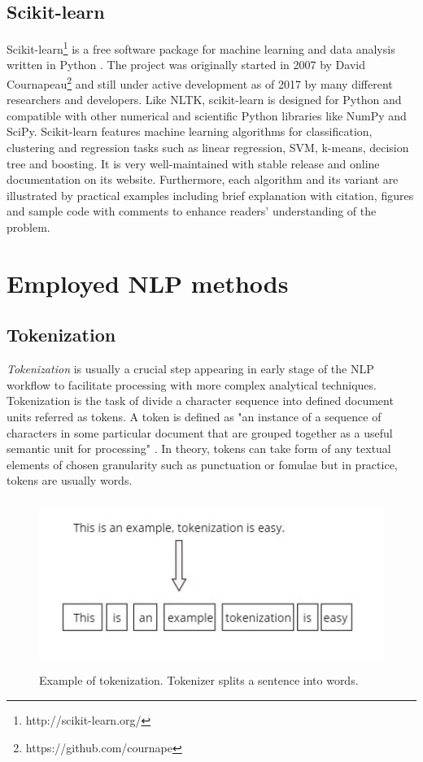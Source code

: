 \subsection*{Scikit-learn}
Scikit-learn\footnote{http://scikit-learn.org/} is a free software package for machine learning and data analysis written in Python \cite{scikit-learn}. The project was originally started in 2007 by David Cournapeau\footnote{https://github.com/cournape} and still under active development as of 2017 by many different researchers and developers. Like NLTK, scikit-learn is designed for Python and compatible with other numerical and scientific Python libraries like NumPy and SciPy. Scikit-learn features machine learning algorithms for classification, clustering and regression tasks such as linear regression, SVM, k-means, decision tree and boosting. It is very well-maintained with stable release and online documentation on its website. Furthermore, each algorithm and its variant are illustrated by practical examples including brief explanation with citation, figures and sample code with comments to enhance readers' understanding of the problem. 


\section{Employed NLP methods}
\subsection*{Tokenization}
\textit{Tokenization} is usually a crucial step appearing in early stage of the NLP workflow to facilitate processing with more complex analytical techniques. Tokenization is the task of divide a character sequence into defined document units referred as tokens. A token is defined as "an instance of a sequence of characters in some particular document that are grouped together as a useful semantic unit for processing" \cite{Manning:2008:IIR:1394399}. In theory, tokens can take form of any textual elements of chosen granularity such as punctuation or fomulae but in practice, tokens are usually words.\\

\begin{figure}
\centering
\includegraphics[width=\textwidth, clip=true, height = 5.5cm]{img/tokenization_example}
\caption[Tokenization example]{ Example of tokenization. Tokenizer splits a sentence into words.} 
\label{fig:token_ex1}
\end{figure}

